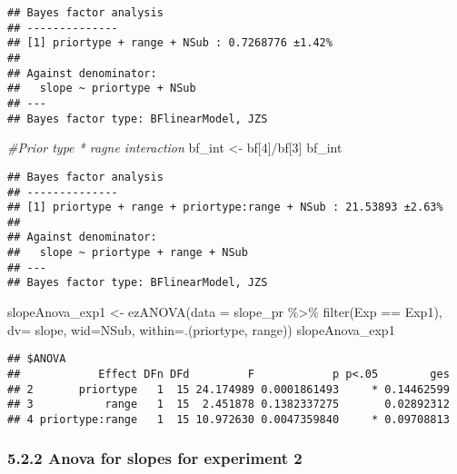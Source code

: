 \documentclass[
]{article}
\newenvironment{Shaded}{\begin{snugshade}}{\end{snugshade}}
\newcommand{\AttributeTok}[1]{\textcolor[rgb]{0.77,0.63,0.00}{#1}}
\newcommand{\CommentTok}[1]{\textcolor[rgb]{0.56,0.35,0.01}{\textit{#1}}}
\newcommand{\DecValTok}[1]{\textcolor[rgb]{0.00,0.00,0.81}{#1}}
\newcommand{\FunctionTok}[1]{\textcolor[rgb]{0.00,0.00,0.00}{#1}}
\newcommand{\NormalTok}[1]{#1}
\newcommand{\OtherTok}[1]{\textcolor[rgb]{0.56,0.35,0.01}{#1}}
\newcommand{\SpecialCharTok}[1]{\textcolor[rgb]{0.00,0.00,0.00}{#1}}
\newcommand{\StringTok}[1]{\textcolor[rgb]{0.31,0.60,0.02}{#1}}
\begin{document}
\begin{verbatim}
## Bayes factor analysis
## --------------
## [1] priortype + range + NSub : 0.7268776 ±1.42%
## 
## Against denominator:
##   slope ~ priortype + NSub 
## ---
## Bayes factor type: BFlinearModel, JZS
\end{verbatim}

\begin{Shaded}
\begin{Highlighting}[]
\CommentTok{\#Prior type * ragne interaction }
\NormalTok{bf\_int }\OtherTok{\textless{}{-}}\NormalTok{ bf[}\DecValTok{4}\NormalTok{]}\SpecialCharTok{/}\NormalTok{bf[}\DecValTok{3}\NormalTok{] }
\NormalTok{bf\_int}
\end{Highlighting}
\end{Shaded}

\begin{verbatim}
## Bayes factor analysis
## --------------
## [1] priortype + range + priortype:range + NSub : 21.53893 ±2.63%
## 
## Against denominator:
##   slope ~ priortype + range + NSub 
## ---
## Bayes factor type: BFlinearModel, JZS
\end{verbatim}

\begin{Shaded}
\begin{Highlighting}[]
\NormalTok{slopeAnova\_exp1 }\OtherTok{\textless{}{-}} \FunctionTok{ezANOVA}\NormalTok{(}\AttributeTok{data =}\NormalTok{ slope\_pr }\SpecialCharTok{\%\textgreater{}\%} \FunctionTok{filter}\NormalTok{(Exp }\SpecialCharTok{==} \StringTok{\textquotesingle{}Exp1\textquotesingle{}}\NormalTok{), }\AttributeTok{dv=}\NormalTok{ slope, }\AttributeTok{wid=}\NormalTok{NSub, }\AttributeTok{within=}\NormalTok{.(priortype, range))}
\NormalTok{slopeAnova\_exp1}
\end{Highlighting}
\end{Shaded}

\begin{verbatim}
## $ANOVA
##            Effect DFn DFd         F            p p<.05        ges
## 2       priortype   1  15 24.174989 0.0001861493     * 0.14462599
## 3           range   1  15  2.451878 0.1382337275       0.02892312
## 4 priortype:range   1  15 10.972630 0.0047359840     * 0.09708813
\end{verbatim}

\hypertarget{anova-for-slopes-for-experiment-2}{%
\subsubsection{5.2.2 Anova for slopes for experiment
2}\label{anova-for-slopes-for-experiment-2}}
\end{document}
